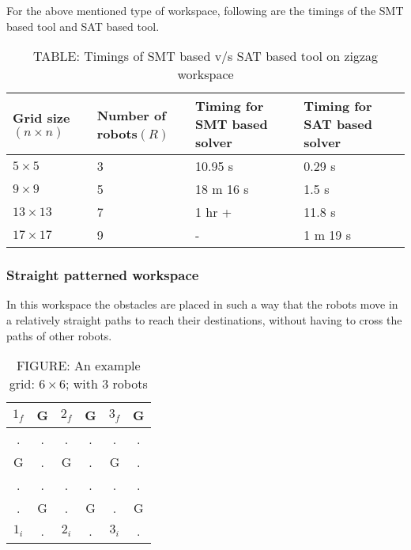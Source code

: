 \documentclass{article}[11pt]
\begin{document}
			For the above mentioned type of workspace, following are the timings of the SMT based tool and SAT based tool.
				\begin{table}[h!]
				\centering
				\begin{tabular}{|| p{2cm} | p{2cm} | p{2cm} | p{2cm} ||} 
				 \hline\hline
				 Grid size$(n \times n)$ & Number of robots$(R)$ & Timing for SMT based solver & Timing for SAT based solver \\ [0.5ex] 
				 \hline\hline
				 $5 \times 5$ & 3 & 10.95 s & 0.29 s \\ 
				 $9 \times 9$ & 5 & 18 m 16 s & 1.5 s \\
				 $13 \times 13$ & 7 & 1 hr + & 11.8 s \\
				 $17 \times 17$ & 9 & - & 1 m 19 s  \\ [1ex]
				 \hline
				\end{tabular}
				\caption*{TABLE: Timings of SMT based v/s SAT based tool on zigzag workspace}
				\end{table}


			\subsubsection{Straight patterned workspace}
			In this workspace the obstacles are placed in such a way that the robots move in a relatively straight paths to reach their destinations, without having to cross the paths of other robots.\\
				\begin{table}[h!]
				\centering
				\begin{tabular}{| c | c | c | c | c | c |} 
				 \hline
				 $1_f$ & G & $2_f$ & G & $3_f$ & G \\ 
				 \hline
				 . & . & . & . & . & . \\
				 \hline
				 G & . & G & . & G & . \\
				 \hline
				 . & . & . & . & . & . \\
				 \hline
				 . & G & . & G & . & G \\
				 \hline
				 $1_i$ & . & $2_i$ & . & $3_i$ & . \\ [1ex] 
				 \hline
				\end{tabular}
				\caption*{FIGURE: An example grid: $6\times 6$; with 3 robots}
				\end{table}
\end{document}
